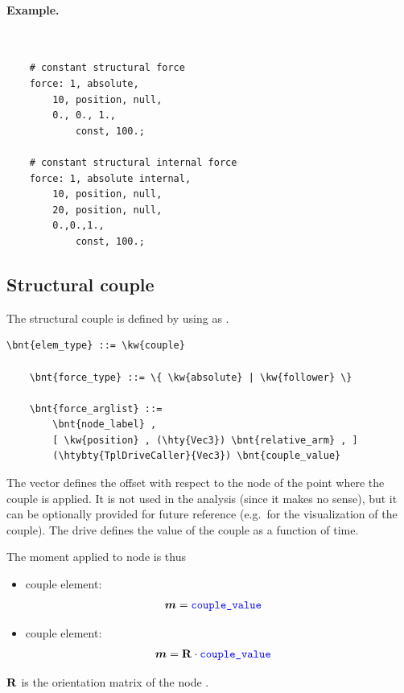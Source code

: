 \paragraph{Example.} \
\begin{verbatim}
    # constant structural force
    force: 1, absolute,
        10, position, null,
        0., 0., 1.,
            const, 100.;

    # constant structural internal force
    force: 1, absolute internal,
        10, position, null,
        20, position, null,
        0.,0.,1.,
            const, 100.;
\end{verbatim}


\subsection{Structural couple}
\label{sec:EL:FORCE:STRUCTURAL:COUPLE}
The structural couple is defined by using  as .
\begin{Verbatim}[commandchars=\\\{\}]
    \bnt{elem_type} ::= \kw{couple}

    \bnt{force_type} ::= \{ \kw{absolute} | \kw{follower} \} 

    \bnt{force_arglist} ::=
        \bnt{node_label} ,
        [ \kw{position} , (\hty{Vec3}) \bnt{relative_arm} , ]
        (\htybty{TplDriveCaller}{Vec3}) \bnt{couple_value}
\end{Verbatim}
The vector  defines the offset with respect
to the node of the point where the couple is applied.
It is not used in the analysis (since it makes no sense),
but it can be optionally provided for future reference
(e.g.\ for the visualization of the couple).
The drive  defines the value of the couple
as a function of time.

The moment applied to node  is thus
\begin{itemize}
\item {} couple element:
\begin{align}
	\boldsymbol{m} & = \textcolor{blue}{\texttt{couple\_value}}
\end{align}

\item {} couple element:
\begin{align}
	\boldsymbol{m} & = \bm{\mathbf R} \cdot \textcolor{blue}{\texttt{couple\_value}}
\end{align}
\end{itemize}
$\bm{\mathbf R}$ is the orientation matrix of the node .

